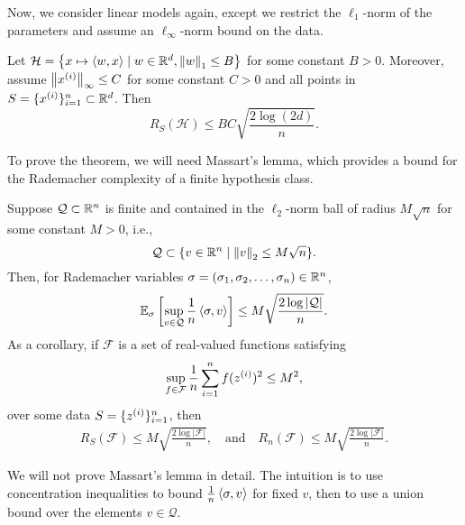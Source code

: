 Now, we consider linear models again, except we restrict the $\ell_1$-norm of the parameters and assume an $\ell_\infty$-norm bound on the data.

\begin{theorem}\label{lec7:thm:l1-thm}
    Let $\mathcal{H} = \cbr{x \mapsto \inprod{w,x} \mid w \in \R^d, \Norm{w}_1 \le B}$ for some constant $B > 0$. Moreover, assume $\Norm{x\sp{i}}_\infty \leq C$ for some constant $C > 0$ and all points in $S = \{x\sp{i}\}_{i=1}^n \subset \R^d$. Then
    \begin{equation}
        R_S(\mathcal{H}) \leq BC\sqrt{\frac{2\log(2d)}{n}}.
    \end{equation}
\end{theorem}

To prove the theorem, we will need Massart's lemma, which provides a bound for the Rademacher complexity of a finite hypothesis class.

    \begin{lemma}
        Suppose $\mathcal{Q} \subset \R^n$ is finite and contained in the $\ell_2$-norm ball of radius $M\sqrt{n}$ for some constant $M > 0$, i.e.,
        \begin{equation}
            \mathcal{Q} \subset \{v \in \R^n \mid \Norm{v}_2 \leq M\sqrt{n} \}.
        \end{equation}
        Then, for Rademacher variables $\sigma = (\sigma_1,\sigma_2,\dots,\sigma_n) \in \R^n$,
        \begin{equation}
            \E_\sigma \left[ \sup_{v\in \mathcal{Q}} \frac{1}{n}\inprod{\sigma,v} \right] \leq M\sqrt{\frac{2\log|\mathcal{Q}|}{n}}.
        \end{equation}
        As a corollary, if $\mathcal{F}$ is a set of real-valued functions satisfying
        \begin{equation}
            \sup_{f\in\mathcal{F}} \frac{1}{n}\sum_{i=1}^n f(z\sp{i})^2 \leq M^2,
        \end{equation}
        over some data $S = \{z\sp{i}\}_{i=1}^n$, then
        \begin{align}
            R_S(\mathcal{F}) \leq M\sqrt{\frac{2\log|\mathcal{F}|}{n}}, \quad\text{and}\quad
            R_n(\mathcal{F}) \leq M\sqrt{\frac{2\log|\mathcal{F}|}{n}}.
        \end{align}
    \end{lemma}

We will not prove Massart's lemma in detail. The intuition is to use concentration inequalities to bound $\frac{1}{n}\inprod{\sigma, v}$ for fixed $v$, then to use a union bound over the elements $v \in \mathcal{Q}$.

